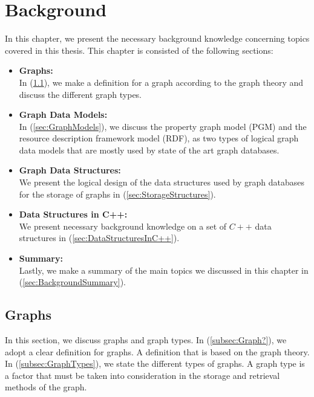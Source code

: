 {\chapter{Background}
\label{chap:Background}

In this chapter, we present the necessary background knowledge concerning topics covered in this thesis. This chapter is consisted of the following sections: 

\begin{itemize}  
\item\textbf{Graphs:}\\
In (\ref{sec:Graphs}), we make a definition for a graph according to the graph theory and discuss the different graph types.

\item \textbf{Graph Data Models:}\\
In (\ref{sec:GraphModels}), we discuss the property graph model (PGM) and the resource description framework model (RDF), as two types of logical graph data models that are mostly used by state of the art graph databases.

\item \textbf{Graph Data Structures:}\\
We present the logical design of the data structures used by graph databases for the storage of graphs in (\ref{sec:StorageStructures}).

\item \textbf{Data Structures in C++:}\\
We present necessary background knowledge on a set of $C++$ data structures in (\ref{sec:DataStructuresInC++}).

\item \textbf{Summary:}\\
Lastly, we make a summary of the main topics we discussed in this chapter in (\ref{sec:BackgroundSummary}).
\end{itemize}

\section{Graphs}
\label{sec:Graphs}
In this section, we discuss graphs and graph  types. In (\ref{subsec:Graph?}), we adopt a clear definition for graphs. A definition that is based on the graph theory. In (\ref{subsec:GraphTypes}), we state the different types of graphs. A graph type is a factor that must be taken into consideration in the storage and retrieval methods of the graph.

}

